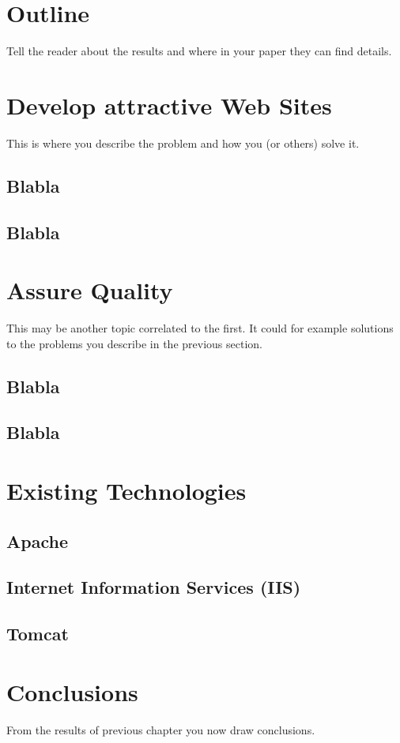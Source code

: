 \documentclass[
  a4paper,               %
  twoside,               %
  headings=small,        %
  DIV=12,                %
  BCOR=1cm,              %
  headinclude=true,      %
  footinclude=true,      %
  numbers=noenddot,      %
  11pt]{scrartcl}        %
\begin{document}
\section{Outline}

Tell the reader about the results and where in
your paper they can find details.

\section{Develop attractive Web Sites}

This is where you describe the problem and how you (or others) solve it.

\subsection{Blabla}

\subsection{Blabla}

\section{Assure Quality}

This may be another topic correlated to the first. It could for example
solutions to the problems you describe in the previous section.

\subsection{Blabla}

\subsection{Blabla}

\section{Existing Technologies}
\subsection{Apache}
\subsection{Internet Information Services (IIS)}
\subsection{Tomcat}

\section{Conclusions}

From the results of previous chapter you now draw conclusions.



\end{document}
